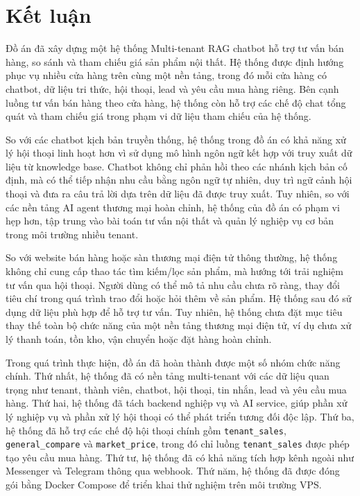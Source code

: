 \documentclass[../DoAn.tex]{subfiles}
\begin{document}
\section{Kết luận}

Đồ án đã xây dựng một hệ thống Multi-tenant RAG chatbot hỗ trợ tư vấn bán hàng, so sánh và tham chiếu giá sản phẩm nội thất. Hệ thống được định hướng phục vụ nhiều cửa hàng trên cùng một nền tảng, trong đó mỗi cửa hàng có chatbot, dữ liệu tri thức, hội thoại, lead và yêu cầu mua hàng riêng. Bên cạnh luồng tư vấn bán hàng theo cửa hàng, hệ thống còn hỗ trợ các chế độ chat tổng quát và tham chiếu giá trong phạm vi dữ liệu tham chiếu của hệ thống.

So với các chatbot kịch bản truyền thống, hệ thống trong đồ án có khả năng xử lý hội thoại linh hoạt hơn vì sử dụng mô hình ngôn ngữ kết hợp với truy xuất dữ liệu từ knowledge base. Chatbot không chỉ phản hồi theo các nhánh kịch bản cố định, mà có thể tiếp nhận nhu cầu bằng ngôn ngữ tự nhiên, duy trì ngữ cảnh hội thoại và đưa ra câu trả lời dựa trên dữ liệu đã được truy xuất. Tuy nhiên, so với các nền tảng AI agent thương mại hoàn chỉnh, hệ thống của đồ án có phạm vi hẹp hơn, tập trung vào bài toán tư vấn nội thất và quản lý nghiệp vụ cơ bản trong môi trường nhiều tenant.

So với website bán hàng hoặc sàn thương mại điện tử thông thường, hệ thống không chỉ cung cấp thao tác tìm kiếm/lọc sản phẩm, mà hướng tới trải nghiệm tư vấn qua hội thoại. Người dùng có thể mô tả nhu cầu chưa rõ ràng, thay đổi tiêu chí trong quá trình trao đổi hoặc hỏi thêm về sản phẩm. Hệ thống sau đó sử dụng dữ liệu phù hợp để hỗ trợ tư vấn. Tuy nhiên, hệ thống chưa đặt mục tiêu thay thế toàn bộ chức năng của một nền tảng thương mại điện tử, ví dụ chưa xử lý thanh toán, tồn kho, vận chuyển hoặc đặt hàng hoàn chỉnh.

Trong quá trình thực hiện, đồ án đã hoàn thành được một số nhóm chức năng chính. Thứ nhất, hệ thống đã có nền tảng multi-tenant với các dữ liệu quan trọng như tenant, thành viên, chatbot, hội thoại, tin nhắn, lead và yêu cầu mua hàng. Thứ hai, hệ thống đã tách backend nghiệp vụ và AI service, giúp phần xử lý nghiệp vụ và phần xử lý hội thoại có thể phát triển tương đối độc lập. Thứ ba, hệ thống đã hỗ trợ các chế độ hội thoại chính gồm \texttt{tenant\_sales}, \texttt{general\_compare} và \texttt{market\_price}, trong đó chỉ luồng \texttt{tenant\_sales} được phép tạo yêu cầu mua hàng. Thứ tư, hệ thống đã có khả năng tích hợp kênh ngoài như Messenger và Telegram thông qua webhook. Thứ năm, hệ thống đã được đóng gói bằng Docker Compose để triển khai thử nghiệm trên môi trường VPS.
\end{document}
